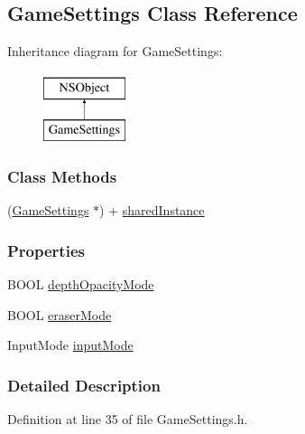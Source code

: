 \hypertarget{interface_game_settings}{\subsection{Game\-Settings Class Reference}
\label{d1/d0c/interface_game_settings}
}
Inheritance diagram for Game\-Settings\-:\begin{figure}[H]
\begin{center}
\leavevmode
\includegraphics[height=2.000000cm]{d1/d0c/interface_game_settings}
\end{center}
\end{figure}
\subsubsection*{Class Methods}
\begin{DoxyCompactItemize}
\item 
(\hyperlink{interface_game_settings}{Game\-Settings} $\ast$) + \hyperlink{interface_game_settings_abdcc2e77ea14381a85c6de67c83df624}{shared\-Instance}
\end{DoxyCompactItemize}
\subsubsection*{Properties}
\begin{DoxyCompactItemize}
\item 
B\-O\-O\-L \hyperlink{interface_game_settings_a1ac5ddcb61e46f952ccd0e876a8578a4}{depth\-Opacity\-Mode}
\item 
B\-O\-O\-L \hyperlink{interface_game_settings_ab192ff4717d84e69f4e3a32a4e38d6b8}{eraser\-Mode}
\item 
Input\-Mode \hyperlink{interface_game_settings_a57e428fbdeeb3dbffa09bb7ffcf6b057}{input\-Mode}
\end{DoxyCompactItemize}


\subsubsection{Detailed Description}


Definition at line 35 of file Game\-Settings.\-h.




